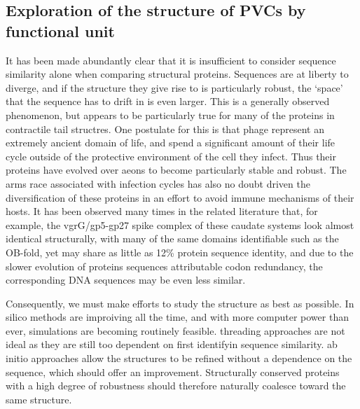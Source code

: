 \subsection{Exploration of the structure of PVCs by functional unit}
It has been made abundantly clear that it is insufficient to consider sequence similarity alone when comparing structural proteins. Sequences are at liberty to diverge, and if the structure they give rise to is particularly robust, the `space' that the sequence has to drift in is even larger. This is a generally observed phenomenon, but appears to be particularly true for many of the proteins in contractile tail structres. One postulate for this is that phage represent an extremely ancient domain of life, and spend a significant amount of their life cycle outside of the protective environment of the cell they infect. Thus their proteins have evolved over aeons to become particularly stable and robust. The arms race associated with infection cycles has also no doubt driven the diversification of these proteins in an effort to avoid immune mechanisms of their hosts. It has been observed many times in the related literature that, for example, the vgrG/gp5-gp27 spike complex of these caudate systems look almost identical structurally, with many of the same domains identifiable such as the OB-fold, yet may share as little as 12\% protein sequence identity, and due to the slower evolution of proteins sequences attributable codon redundancy, the corresponding DNA sequences may be even less similar.

Consequently, we must make efforts to study the structure as best as possible. In silico methods are improiving all the time, and with more computer power than ever, simulations are becoming routinely feasible. threading approaches are not ideal as they are still too dependent on first identifyin sequence similarity. ab initio approaches allow the structures to be refined without a dependence on the sequence, which should offer an improvement. Structurally conserved proteins with a high degree of robustness should therefore naturally coalesce toward the same structure.

